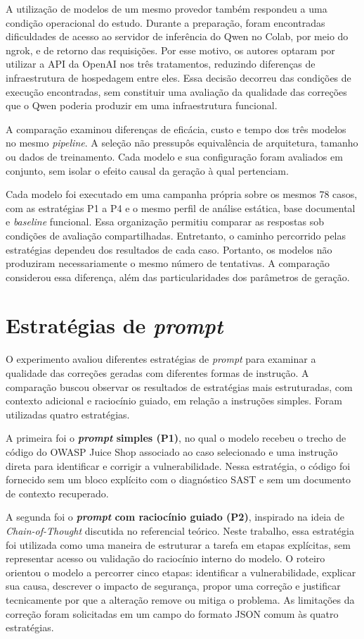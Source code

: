 A utilização de modelos de um mesmo provedor também respondeu a uma condição operacional do estudo. Durante a preparação, foram encontradas dificuldades de acesso ao servidor de inferência do Qwen no Colab, por meio do ngrok, e de retorno das requisições. Por esse motivo, os autores optaram por utilizar a API da OpenAI nos três tratamentos, reduzindo diferenças de infraestrutura de hospedagem entre eles. Essa decisão decorreu das condições de execução encontradas, sem constituir uma avaliação da qualidade das correções que o Qwen poderia produzir em uma infraestrutura funcional.

A comparação examinou diferenças de eficácia, custo e tempo dos três modelos no mesmo \textit{pipeline}. A seleção não pressupôs equivalência de arquitetura, tamanho ou dados de treinamento. Cada modelo e sua configuração foram avaliados em conjunto, sem isolar o efeito causal da geração à qual pertenciam.

Cada modelo foi executado em uma campanha própria sobre os mesmos 78 casos, com as estratégias P1 a P4 e o mesmo perfil de análise estática, base documental e \textit{baseline} funcional. Essa organização permitiu comparar as respostas sob condições de avaliação compartilhadas. Entretanto, o caminho percorrido pelas estratégias dependeu dos resultados de cada caso. Portanto, os modelos não produziram necessariamente o mesmo número de tentativas. A comparação considerou essa diferença, além das particularidades dos parâmetros de geração.

\section{Estratégias de \textit{prompt}}
\label{sec:met-prompts}

O experimento avaliou diferentes estratégias de \textit{prompt} para examinar a qualidade das correções geradas com diferentes formas de instrução. A comparação buscou observar os resultados de estratégias mais estruturadas, com contexto adicional e raciocínio guiado, em relação a instruções simples. Foram utilizadas quatro estratégias.

A primeira foi o \textbf{\textit{prompt} simples (P1)}, no qual o modelo recebeu o trecho de código do OWASP Juice Shop associado ao caso selecionado e uma instrução direta para identificar e corrigir a vulnerabilidade. Nessa estratégia, o código foi fornecido sem um bloco explícito com o diagnóstico SAST e sem um documento de contexto recuperado.

A segunda foi o \textbf{\textit{prompt} com raciocínio guiado (P2)}, inspirado na ideia de \textit{Chain-of-Thought} discutida no referencial teórico. Neste trabalho, essa estratégia foi utilizada como uma maneira de estruturar a tarefa em etapas explícitas, sem representar acesso ou validação do raciocínio interno do modelo. O roteiro orientou o modelo a percorrer cinco etapas: identificar a vulnerabilidade, explicar sua causa, descrever o impacto de segurança, propor uma correção e justificar tecnicamente por que a alteração remove ou mitiga o problema. As limitações da correção foram solicitadas em um campo do formato JSON comum às quatro estratégias.

